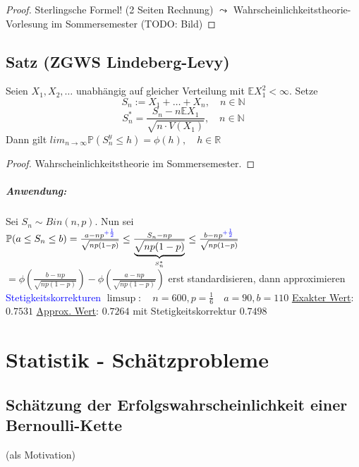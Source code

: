 \documentclass[a4paper,11pt,notitlepage]{report}
\newcommand{\R}{{\ensuremath{\mathbb{R}}}}
\newcommand{\N}{{\ensuremath{\mathbb{N}}}}
\newcommand{\Prim}{{\ensuremath{\mathbb{P}}}}
\newcommand{\E}{{\ensuremath{\mathbb{E}}}}
\begin{document}
\begin{proof}
	Sterlingsche Formel! (2 Seiten Rechnung) $\leadsto$ Wahrscheinlichkeitstheorie-Vorlesung im Sommersemester
	\newline
	(TODO: Bild)
\end{proof}

\section{Satz (ZGWS Lindeberg-Levy)}
Seien $X_1, X_2, \ldots$ unabhängig auf gleicher Verteilung mit $\E X_1^2 < \infty$.
Setze $$S_n := X_1 + \ldots + X_n, \quad n \in \N$$
$$S_n^* = \frac{S_n - n \E X_1}{\sqrt{n \cdot V(X_1)}}, \quad n \in \N$$
Dann gilt $lim_{n \rightarrow \infty}{\Prim(S_n^y \leq h)} = \phi(h), \quad h \in \R$

\begin{proof}
	Wahrscheinlichkeitstheorie im Sommersemester.
\end{proof}

\paragraph{Anwendung:}
Sei $S_n \sim Bin(n,p)$. \newline
Nun sei $\Prim(a \leq S_n \leq b) = \frac{a - np^{ \textcolor{blue}{+ \frac{1}{2}}}}{\sqrt{n p (1-p)}} \leq \frac{S_n - np}{\underbrace{\sqrt{n p (1-p)}}_{S_n^*}} \leq \frac{b - np ^{\textcolor{blue}{+\frac{1}{2}}}}{\sqrt{n p (1-p)}} $
$= \phi\left(\frac{b-np}{\sqrt{n p (1-p)}}\right) - \phi\left(\frac{a-np}{\sqrt{n p (1-p)}}\right)$
\newline
erst standardisieren, dann approximieren
\newline
\textcolor{blue}{Stetigkeitskorrekturen}
\newline
$\limsup \colon \quad n = 600, p = \frac{1}{6} \quad a = 90, b = 110$
\newline
\underline{Exakter Wert}: $0.7531$
\newline
\underline{Approx. Wert}: $0.7264$ mit Stetigkeitskorrektur $0.7498$

\chapter{Statistik - Schätzprobleme}

\section{Schätzung der Erfolgswahrscheinlichkeit einer Bernoulli-Kette} (als Motivation)
\end{document}
